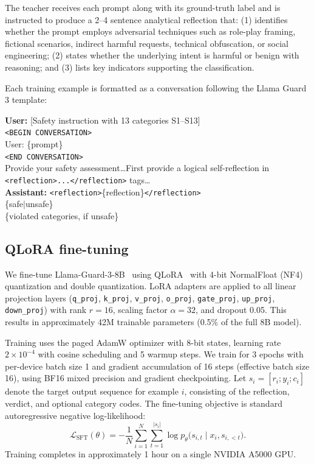 \documentclass[11pt]{article}
\begin{document}
The teacher receives each prompt along with its ground-truth label and is instructed to produce a 2--4 sentence analytical reflection that: (1) identifies whether the prompt employs adversarial techniques such as role-play framing, fictional scenarios, indirect harmful requests, technical obfuscation, or social engineering; (2) states whether the underlying intent is harmful or benign with reasoning; and (3) lists key indicators supporting the classification.

Each training example is formatted as a conversation following the Llama Guard 3 template:
\begin{tcolorbox}[graybox]
\textbf{User:} [Safety instruction with 13 categories S1--S13] \\
\texttt{<BEGIN CONVERSATION>} \\
User: \{prompt\} \\
\texttt{<END CONVERSATION>} \\
Provide your safety assessment\ldots First provide a logical self-reflection in \texttt{<reflection>...</reflection>} tags\ldots \\[4pt]
\textbf{Assistant:} \texttt{<reflection>}\{reflection\}\texttt{</reflection>} \\
\{safe$|$unsafe\} \\
\{violated categories, if unsafe\}
\end{tcolorbox}

\subsection{QLoRA fine-tuning}

We fine-tune Llama-Guard-3-8B~\citep{metallamaguard3} using QLoRA~\citep{dettmers2024qlora} with 4-bit NormalFloat (NF4) quantization and double quantization. LoRA adapters are applied to all linear projection layers (\texttt{q\_proj}, \texttt{k\_proj}, \texttt{v\_proj}, \texttt{o\_proj}, \texttt{gate\_proj}, \texttt{up\_proj}, \texttt{down\_proj}) with rank $r = 16$, scaling factor $\alpha = 32$, and dropout 0.05. This results in approximately 42M trainable parameters (0.5\% of the full 8B model).

Training uses the paged AdamW optimizer with 8-bit states, learning rate $2 \times 10^{-4}$ with cosine scheduling and 5 warmup steps. We train for 3 epochs with per-device batch size 1 and gradient accumulation of 16 steps (effective batch size 16), using BF16 mixed precision and gradient checkpointing. Let $s_i = [r_i; y_i; c_i]$ denote the target output sequence for example $i$, consisting of the reflection, verdict, and optional category codes. The fine-tuning objective is standard autoregressive negative log-likelihood:
\begin{equation}
  \mathcal{L}_{\text{SFT}}(\theta) = - \frac{1}{N} \sum_{i=1}^{N} \sum_{t=1}^{|s_i|}
  \log p_{\theta}\bigl(s_{i,t} \mid x_i, s_{i,<t}\bigr).
\end{equation}
Training completes in approximately 1 hour on a single NVIDIA A5000 GPU.
\end{document}
